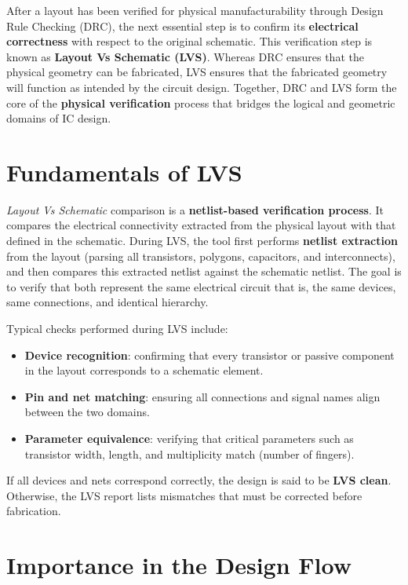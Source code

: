 \documentclass[
  11pt,
  a4paper,
  oneside]{scrbook}
\providecommand{\tightlist}{%
  \setlength{\itemsep}{0pt}\setlength{\parskip}{0pt}}
\begin{document}
After a layout has been verified for physical manufacturability through
Design Rule Checking (DRC), the next essential step is to confirm its
\textbf{electrical correctness} with respect to the original schematic.
This verification step is known as \textbf{Layout Vs Schematic (LVS)}.
Whereas DRC ensures that the physical geometry can be fabricated, LVS
ensures that the fabricated geometry will function as intended by the
circuit design. Together, DRC and LVS form the core of the
\textbf{physical verification} process that bridges the logical and
geometric domains of IC design.

\section{Fundamentals of LVS}\label{fundamentals-of-lvs}

\emph{Layout Vs Schematic} comparison is a \textbf{netlist-based
verification process}. It compares the electrical connectivity extracted
from the physical layout with that defined in the schematic. During LVS,
the tool first performs \textbf{netlist extraction} from the layout
(parsing all transistors, polygons, capacitors, and interconnects), and
then compares this extracted netlist against the schematic netlist. The
goal is to verify that both represent the same electrical circuit that
is, the same devices, same connections, and identical hierarchy.

Typical checks performed during LVS include:

\begin{itemize}
\tightlist
\item
  \textbf{Device recognition}: confirming that every transistor or
  passive component in the layout corresponds to a schematic element.\\
\item
  \textbf{Pin and net matching}: ensuring all connections and signal
  names align between the two domains.\\
\item
  \textbf{Parameter equivalence}: verifying that critical parameters
  such as transistor width, length, and multiplicity match (number of
  fingers).
\end{itemize}

If all devices and nets correspond correctly, the design is said to be
\textbf{LVS clean}. Otherwise, the LVS report lists mismatches that must
be corrected before fabrication.

\section{Importance in the Design
Flow}\label{importance-in-the-design-flow-1}
\end{document}

